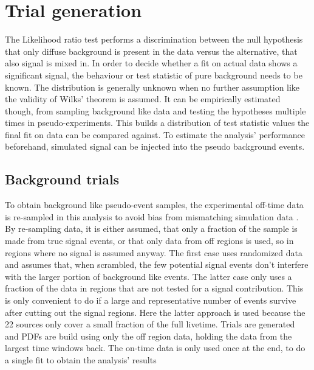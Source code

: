 \section{Trial generation}
The Likelihood ratio test performs a discrimination between the null hypothesis that only diffuse background is present in the data versus the alternative, that also signal is mixed in.
In order to decide whether a fit on actual data shows a significant signal, the behaviour or test statistic of pure background needs to be known.
The distribution is generally unknown when no further assumption like the validity of Wilks' theorem is assumed.
It can be empirically estimated though, from sampling background like data and testing the hypotheses multiple times in pseudo-experiments.
This builds a distribution of test statistic values the final fit on data can be compared against.
To estimate the analysis' performance beforehand, simulated signal can be injected into the pseudo background events.

\subsection*{Background trials}
To obtain background like pseudo-event samples, the experimental off-time data is re-sampled in this analysis to avoid bias from mismatching simulation data \cite{Aartsen:2016lir}.
By re-sampling data, it is either assumed, that only a fraction of the sample is made from true signal events, or that only data from off regions is used, so in regions where no signal is assumed anyway.
The first case uses randomized data and assumes that, when scrambled, the few potential signal events don't interfere with the larger portion of background like events.
The latter case only uses a fraction of the data in regions that are not tested for a signal contribution.
This is only convenient to do if a large and representative number of events survive after cutting out the signal regions.
Here the latter approach is used because the 22 sources only cover a small fraction of the full livetime.
Trials are generated and PDFs are build using only the off region data, holding the data from the largest time windows back.
The on-time data is only used once at the end, to do a single fit to obtain the analysis' results

